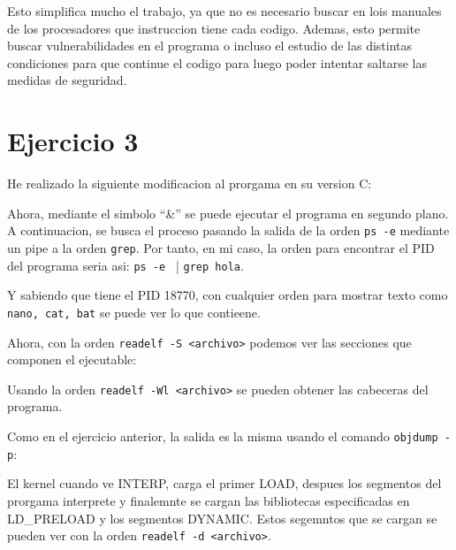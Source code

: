 \documentclass{article}
\begin{document}

Esto simplifica mucho el trabajo, ya que no es necesario buscar en lois manuales de los procesadores que instruccion tiene cada codigo. Ademas, esto permite buscar vulnerabilidades en el programa o incluso el estudio de las distintas condiciones para que continue el codigo para luego poder intentar saltarse las medidas de seguridad.


\section*{Ejercicio 3}

He realizado la siguiente modificacion al prorgama en su version C:




Ahora, mediante el simbolo ``\&'' se puede ejecutar el programa en segundo plano. A continuacion, se busca el proceso pasando la salida de la orden \verb|ps -e| mediante un pipe a la orden \verb|grep|. Por tanto, en mi caso, la orden para encontrar el PID del programa seria asi: \verb|ps -e | | \verb|grep hola|.


Y sabiendo que tiene el PID 18770, con cualquier orden para mostrar texto como \verb|nano, cat, bat| se puede ver lo que contieene.


Ahora, con la orden \verb|readelf -S <archivo>| podemos ver las secciones que componen el ejecutable:


Usando la orden \verb|readelf -Wl <archivo>| se pueden obtener las cabeceras del programa.


Como en el ejercicio anterior, la salida es la misma usando el comando \verb|objdump -p|:



El kernel cuando ve INTERP, carga el primer LOAD, despues los segmentos del prorgama interprete y finalemnte se cargan las bibliotecas especificadas en LD\_PRELOAD y los segmentos DYNAMIC. Estos segemntos que se cargan se pueden ver con la orden \verb|readelf -d <archivo>|.

\end{document}
